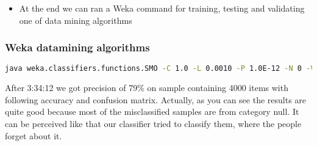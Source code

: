 \begin{itemize}
        \begin{itemize}
            \item We launch Weka
            \item Switched to Explorer
            \item Set up {\it Component} as label attribute for training and testing
            \item Choose 10 fold cross validation
            \item Choose Support Vector Machines (SMO)
            \item Copy parameters generated by GUI to command line
        \end{itemize}
    \item At the end we can ran a Weka command for training, testing and validating one of data mining algorithms 
\end{itemize}

\subsubsection{Weka datamining algorithms} %
\label{ssub:Weka datamining algorithms}




\begin{lstlisting}[language=sh]
    java weka.classifiers.functions.SMO -C 1.0 -L 0.0010 -P 1.0E-12 -N 0 -V -1 -W 1 -K "weka.classifiers.functions.supportVector.PolyKernel -C 250007 -E 1.0" -t sample-vectorised.arff -c 7> smo.out
\end{lstlisting}
    \item After 3:34:12 we got precision of 79\% on sample containing 4000 items with following accuracy and confusion matrix.
    Actually, as you can see the results are quite good because most of the misclassified samples are from category null.
    It can be perceived like that our classifier tried to classify them, where the people forget about it.

